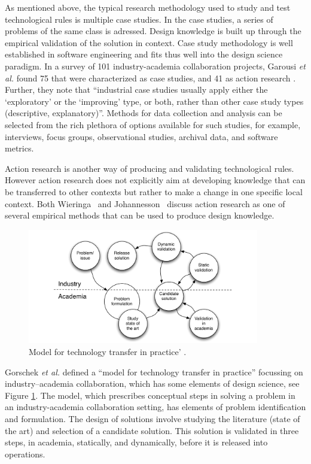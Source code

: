 \documentclass[graybox]{svmult}
\begin{document}
As mentioned above, the typical research methodology used to study and test technological rules is multiple case studies. In the case studies, a series of problems of the same class is adressed. Design knowledge is built up through the empirical validation of the solution in context. Case study methodology is well established in software engineering \cite{Runeson12Case} and fits thus well into the design science paradigm. In a survey of 101 industry-academia collaboration projects, Garousi \emph{et al.} found 75 that were characterized as case studies, and 41 as action research \cite{Garousi2019}. Further, they note that ``industrial case studies usually apply either the `exploratory' or the `improving' type, or both, rather than other case study types (descriptive, explanatory)''. Methods for data collection and analysis can be selected from the rich plethora of options available for such studies, for example, interviews, focus groups, observational studies, archival data, and software metrics. 

Action research is another way of producing and validating technological rules. However action research does not explicitly aim at developing knowledge that can be transferred to other contexts but rather to make a change in one specific local context. Both Wieringa~\cite{wieringa_technical_2012} and Johannesson~\cite{johannesson_introduction_2014} discuss action research as one of several empirical methods that can be used to produce design knowledge.


\begin{figure}[t]
  \includegraphics[width=0.9\textwidth]{Figures/GorschekModel.pdf}
\caption{Model for technology transfer in practice' \cite{GorschekSW2006}.}
\label{fig:GorschekModel}       %
\end{figure}

Gorschek \emph{et al.} defined a ``model for technology transfer in practice'' \cite{GorschekSW2006} focussing on industry--academia collaboration, which has some elements of design science, see Figure \ref{fig:GorschekModel}. The model, which prescribes conceptual steps in solving a problem in an industry-academia collaboration setting, has elements of problem identification and formulation. The design of solutions involve studying the literature (state of the art) and selection of a candidate solution. This solution is validated in three steps, in academia, statically, and dynamically, before it is released into operations. 
\end{document}
